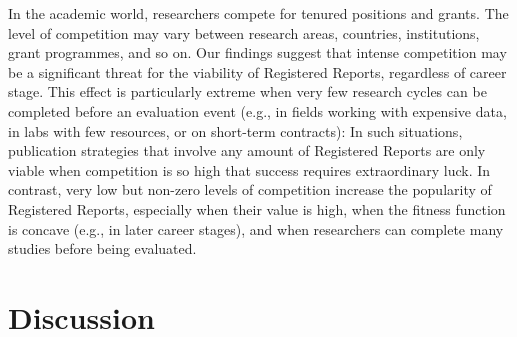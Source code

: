 \documentclass[
  ,man,mask,floatsintext]{apa6}
\begin{document}
In the academic world, researchers compete for tenured positions and grants.
The level of competition may vary between research areas, countries, institutions, grant programmes, and so on.
Our findings suggest that intense competition may be a significant threat for the viability of Registered Reports, regardless of career stage.
This effect is particularly extreme when very few research cycles can be completed before an evaluation event (e.g., in fields working with expensive data, in labs with few resources, or on short-term contracts):
In such situations, publication strategies that involve any amount of Registered Reports are only viable when competition is so high that success requires extraordinary luck.
In contrast, very low but non-zero levels of competition increase the popularity of Registered Reports, especially when their value is high, when the fitness function is concave (e.g., in later career stages), and when researchers can complete many studies before being evaluated.

\hypertarget{discussion}{%
\section{Discussion}\label{discussion}}
\end{document}
